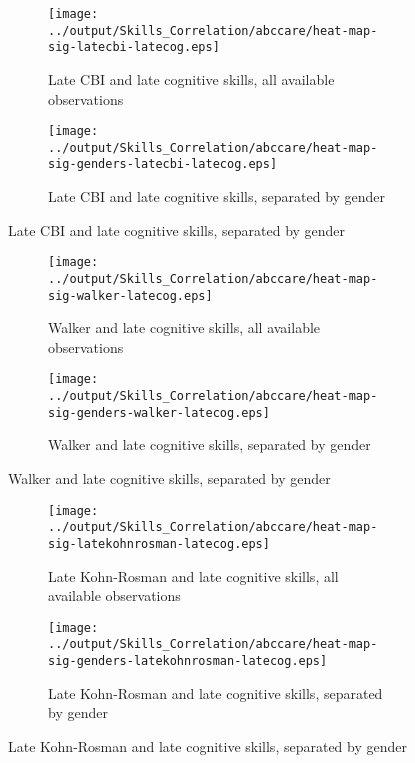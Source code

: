     \begin{figure}[H]
      \centering
      \caption{Heat map with $p$-values of late non-cognitive instruments against late cognitive}
      \label{fig:latesocio-latecog}
      \begin{subfigure}{0.85\textwidth}     
        \centering
        \caption{Late CBI and late cognitive skills, all available observations}
        \texttt{[image: ../output/Skills\_Correlation/abccare/heat-map-sig-latecbi-latecog.eps]}
        \label{fig:latecbi-latecog-nogender}
      \end{subfigure}

      \begin{subfigure}{0.85\textwidth}    
        \centering
        \caption{Late CBI and late cognitive skills, separated by gender}
        \texttt{[image: ../output/Skills\_Correlation/abccare/heat-map-sig-genders-latecbi-latecog.eps]}
        \label{fig:latecbi-latecog-gender}
      \end{subfigure}
    \end{figure}
    \clearpage
    \begin{figure}[H]
      \ContinuedFloat \centering    
      \begin{subfigure}{0.85\textwidth} 
        \centering
        \caption{Walker and late cognitive skills, all available observations}
        \texttt{[image: ../output/Skills\_Correlation/abccare/heat-map-sig-walker-latecog.eps]}  
        \label{fig:walker-latecog-nogender}
      \end{subfigure}

      \begin{subfigure}{0.85\textwidth} 
        \centering
        \caption{Walker and late cognitive skills, separated by gender}
        \texttt{[image: ../output/Skills\_Correlation/abccare/heat-map-sig-genders-walker-latecog.eps]}
        \label{fig:walker-latecog-gender}
      \end{subfigure}
    \end{figure}
    \clearpage
    \begin{figure}[H]
      \ContinuedFloat \centering
      \begin{subfigure}{0.85\textwidth}  
        \centering
        \caption{Late Kohn-Rosman and late cognitive skills, all available observations}         
        \texttt{[image: ../output/Skills\_Correlation/abccare/heat-map-sig-latekohnrosman-latecog.eps]}
        \label{fig:latekr-latecog-nogender}
      \end{subfigure}

      \begin{subfigure}{0.85\textwidth}  
        \centering
        \caption{Late Kohn-Rosman and late cognitive skills, separated by gender}         
        \texttt{[image: ../output/Skills\_Correlation/abccare/heat-map-sig-genders-latekohnrosman-latecog.eps]}
        \label{fig:latekr-latecog-gender}
      \end{subfigure}
    \end{figure}
